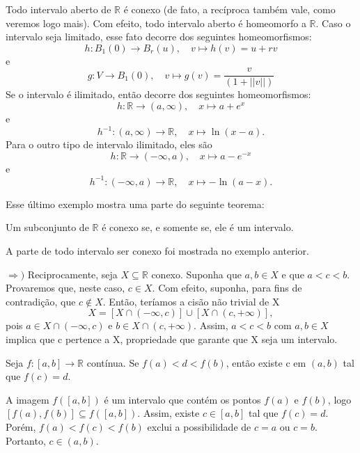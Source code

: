 \documentclass[metric_notes.tex]{subfiles}
\begin{document}
\begin{example}
	Todo intervalo aberto de \(\mathbb{R}\) é conexo (de fato, a recíproca também vale, como veremos logo mais). Com efeito, todo intervalo
	aberto é homeomorfo a \(\mathbb{R}\). Caso o intervalo seja limitado, esse fato decorre dos seguintes homeomorfismos:
	\[
		h:B_{1}(0)\rightarrow B_{r}(u),\quad v\mapsto h(v) = u + rv
	\]
	e
	\[
		g:V\rightarrow B_{1}(0),\quad v\mapsto g(v) = \frac{v}{(1+||v||)}
	\]
	Se o intervalo é ilimitado, então decorre dos seguintes homeomorfismos:
	\[
		h:\mathbb{R}\rightarrow (a, \infty),\quad x\mapsto a + e^{x}
	\]
	e
	\[
		h^{-1}:(a, \infty)\rightarrow \mathbb{R},\quad x\mapsto \ln{(x-a)}.
	\]
	Para o outro tipo de intervalo ilimitado, eles são
	\[
		h:\mathbb{R}\rightarrow (-\infty, a),\quad x\mapsto a - e^{-x}
	\]
	e
	\[
		h^{-1}:(-\infty, a)\rightarrow \mathbb{R},\quad x\mapsto -\ln{(a-x)}.
	\]
\end{example}
Esse último exemplo mostra uma parte do seguinte teorema:
\begin{theorem*}
	Um subconjunto de \(\mathbb{R}\) é conexo se, e somente se, ele é um intervalo.
\end{theorem*}
\begin{proof*}
	A parte de todo intervalo ser conexo foi mostrada no exemplo anterior.

	\(\Rightarrow )\) Reciprocamente, seja \(X\subseteq{\mathbb{R}}\) conexo. Suponha que \(a, b\in X\) e que
	\(a < c < b.\) Provaremos que, neste caso, \(c\in X\). Com efeito, suponha, para fins de contradição, que
	\(c\not\in X.\) Então, teríamos a cisão não trivial de X
	\[
		X = [X\cap(-\infty, c)]\cup[X\cap(c, +\infty)],
	\]
	pois \(a\in X\cap(-\infty, c)\) e \(b\in X\cap(c, +\infty).\) Assim, \(a < c < b\) com \(a, b\in X\) implica que c pertence a X, propriedade que
	garante que X seja um intervalo. \qedsymbol
\end{proof*}
\hypertarget{intermediate_value}{\begin{crl*}
		Seja \(f:[a, b]\rightarrow \mathbb{R}\) contínua. Se \(f(a) < d < f(b)\), então existe c em \((a, b)\) tal que \(f(c) = d.\)
	\end{crl*}}
\begin{proof*}
	A imagem \(f([a, b])\) é um intervalo que contém os pontos \(f(a)\) e \(f(b)\), logo \([f(a), f(b)]\subseteq{f([a, b])}.\) Assim,
	existe \(c\in[a, b]\) tal que \(f(c) = d\). Porém, \(f(a) < f(c) < f(b)\) exclui a possibilidade de \(c = a\) ou \(c = b\). Portanto,
	\(c\in (a, b)\). \qedsymbol
\end{proof*}
\end{document}
